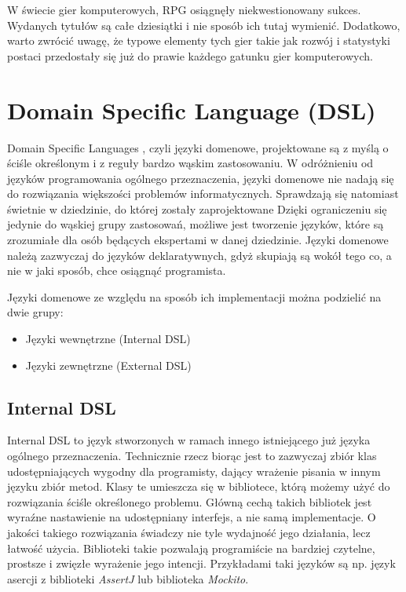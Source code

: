\documentclass[openright]{xmgr}
\begin{document}
W świecie gier komputerowych, RPG osiągnęły niekwestionowany sukces. Wydanych tytułów są całe dziesiątki i nie sposób ich tutaj wymienić. Dodatkowo, warto zwrócić uwagę, że typowe elementy tych gier takie jak rozwój i statystyki postaci przedostały się już do prawie każdego gatunku gier komputerowych.

\section{Domain Specific Language (DSL)}

Domain Specific Languages \cite{DSL:2017}, czyli języki domenowe, projektowane są z myślą o ściśle określonym i z reguły bardzo wąskim zastosowaniu. W odróżnieniu od języków programowania ogólnego przeznaczenia, języki domenowe nie nadają się do rozwiązania większości problemów informatycznych. Sprawdzają się natomiast świetnie w dziedzinie, do której zostały zaprojektowane Dzięki ograniczeniu się jedynie do wąskiej grupy zastosowań, możliwe jest tworzenie języków, które są zrozumiałe dla osób będących ekspertami w danej dziedzinie. Języki domenowe należą zazwyczaj do języków deklaratywnych, gdyż skupiają są wokół tego co, a nie w jaki sposób, chce osiągnąć programista.

Języki domenowe ze względu na sposób ich implementacji można podzielić na dwie grupy:
\begin{itemize}
\item Języki wewnętrzne (Internal DSL)
\item Języki zewnętrzne (External DSL)
\end{itemize}

\subsection{Internal DSL}

Internal DSL to język stworzonych w ramach innego istniejącego już języka ogólnego przeznaczenia. Technicznie rzecz biorąc jest to zazwyczaj zbiór klas udostępniających wygodny dla programisty, dający wrażenie pisania w innym języku zbiór metod. Klasy te umieszcza się w bibliotece, którą możemy użyć do rozwiązania ściśle określonego problemu. Główną cechą takich bibliotek jest wyraźne nastawienie na udostępniany interfejs, a nie samą implementacje. O jakości takiego rozwiązania świadczy nie tyle wydajność jego działania, lecz łatwość użycia. Biblioteki takie pozwalają programiście na bardziej czytelne, prostsze i zwięzłe wyrażenie jego intencji. Przykładami taki języków są np. język asercji z biblioteki \textit{AssertJ} lub  biblioteka \textit{Mockito}. 
\end{document}
